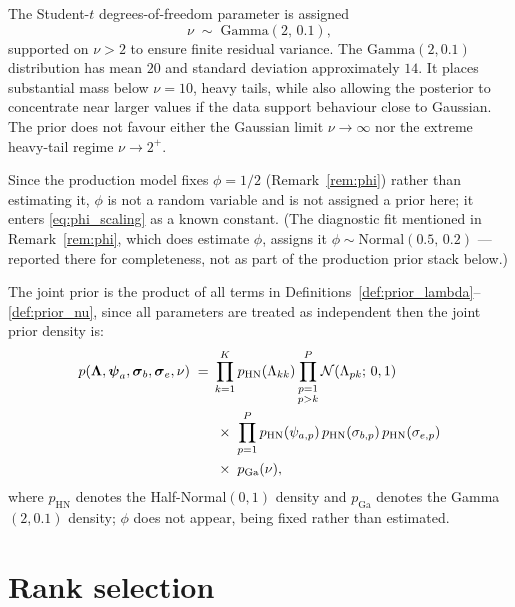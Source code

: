 \begin{definition}
\label{def:prior_nu}
The Student-$t$ degrees-of-freedom parameter is assigned
\begin{equation}
\nu \;\sim\; \mathrm{Gamma}(2,\, 0.1),
\label{eq:prior_nu}
\end{equation}
supported on $\nu > 2$ to ensure finite residual variance. The $\mathrm{Gamma}(2, 0.1)$ distribution has mean $20$ and standard deviation approximately $14$. It places substantial mass below $\nu = 10$, heavy tails, while also allowing the posterior to concentrate near larger values if the data support behaviour close to Gaussian. The prior does not favour either the Gaussian limit $\nu \to \infty$ nor the extreme heavy-tail regime $\nu \to 2^+$\cite{juarez2010model}.
\end{definition}

Since the production model fixes $\phi=1/2$ (Remark~\ref{rem:phi}) rather than estimating it, $\phi$ is not a random variable and is not assigned a prior here; it enters \eqref{eq:phi_scaling} as a known constant. (The diagnostic fit mentioned in Remark~\ref{rem:phi}, which does estimate $\phi$, assigns it $\phi \sim \mathrm{Normal}(0.5,\, 0.2)$ --- reported there for completeness, not as part of the production prior stack below.)

The joint prior is the product of all terms in Definitions~\ref{def:prior_lambda}--\ref{def:prior_nu}, since all parameters are treated as independent then the joint prior density is:
\begin{align}
p\!\left(\boldsymbol{\Lambda}, \boldsymbol{\psi}_a, \boldsymbol{\sigma}_b, \boldsymbol{\sigma}_e, \nu\right)
\;=\;
&\prod_{k=1}^{K} p_{\mathrm{HN}}(\Lambda_{kk})
\prod_{\substack{p=1\\p>k}}^{P} \mathcal{N}(\Lambda_{pk};\, 0, 1) \notag \\
&\;\times\;
\prod_{p=1}^{P} p_{\mathrm{HN}}(\psi_{a,p})\,p_{\mathrm{HN}}(\sigma_{b,p})\,p_{\mathrm{HN}}(\sigma_{e,p}) \notag \\
&\;\times\;
p_{\mathrm{Ga}}(\nu),
\label{eq:joint_prior}
\end{align}
where $p_{\mathrm{HN}}$ denotes the Half-Normal$(0,1)$ density and $p_{\mathrm{Ga}}$ denotes the Gamma$(2,0.1)$ density; $\phi$ does not appear, being fixed rather than estimated.

\section{Rank selection}
\label{sec:rank}

